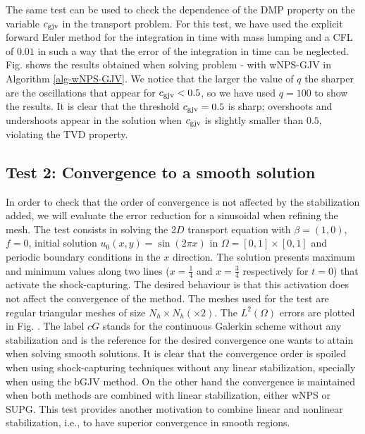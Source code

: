 The same test can be used to check the dependence of the DMP property on the variable $c_{\rm gjv}$ in the transport problem.  For this test, we have used the explicit forward Euler method for the integration in time with mass lumping and a CFL of $0.01$ in such a way that the error of the integration in time can be neglected. Fig.  shows the results obtained when solving problem - with  wNPS-GJV in Algorithm \ref{alg-wNPS-GJV}. We notice that the larger the value of $q$ the sharper are the oscillations that appear for $c_{\rm gjv} < 0.5$, so we have used $q=100$ to show the results. It is clear that the threshold $c_{\rm gjv} = 0.5$ is sharp; overshoots and undershoots appear in the solution when $c_{\rm gjv}$ is slightly smaller than $0.5$, violating the TVD property.


\subsection{Test 2: Convergence to a smooth solution}

In order to check that the order of convergence is not affected by the stabilization added, we will evaluate the error reduction for a sinusoidal when refining the mesh. The test consists in solving the 2$D$ transport equation  with $\beta = (1,0)$, $f=0$, initial solution $u_0(x,y) = \sin(2\pi x)$ in $\Omega=[0,1]\times[0,1]$ and periodic boundary conditions in the $x$ direction. The solution presents  maximum and minimum values along two lines ($x=\frac{1}{4}$ and $x=\frac{3}{4}$ respectively for $t=0$) that activate the shock-capturing. The desired behaviour is that this activation does not affect the convergence of the method. The meshes used for the test are regular triangular meshes of size $N_h\times N_h(\times 2)$. The $L^2(\Omega)$ errors are plotted in Fig. . The label $cG$ stands for the continuous Galerkin scheme without any stabilization and is the reference for the desired convergence one wants to attain when solving smooth solutions. It is clear that the convergence order is spoiled when using shock-capturing techniques without any linear stabilization, specially when using the bGJV method. On the other hand the convergence is maintained when both methods are combined with linear stabilization, either wNPS or SUPG. This test provides another motivation to combine linear and nonlinear stabilization, i.e., to have superior convergence in smooth regions.

